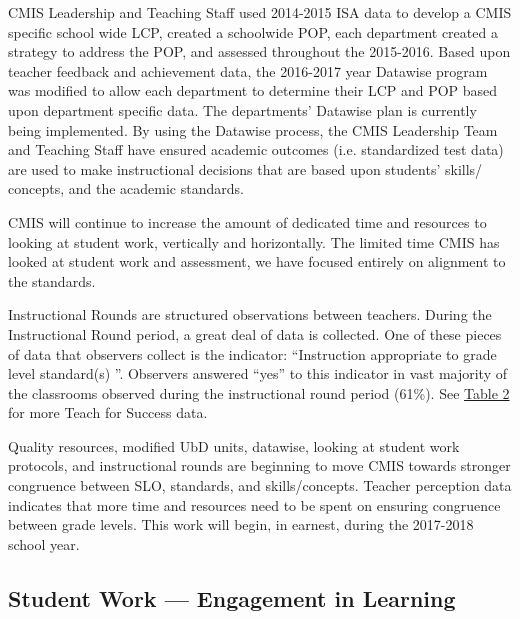 \documentclass{report}
\begin{document}
\begin{findings}
CMIS Leadership and Teaching Staff used 2014-2015 ISA data to develop a CMIS specific school wide LCP, created a schoolwide POP, each department created a strategy to address the POP, and assessed throughout the 2015-2016. Based upon teacher feedback and achievement data, the 2016-2017 year Datawise program was modified to allow each department to determine their LCP and POP based upon department specific data. The departments’ Datawise plan is currently being implemented. By using the Datawise process, the CMIS Leadership Team and Teaching Staff have ensured academic outcomes (i.e. standardized test data) are used to make instructional decisions that are based upon students’ skills/ concepts, and the academic standards. 


CMIS will continue to increase the amount of  dedicated time and resources to looking at student work, vertically and horizontally. The limited time CMIS has looked at student work and assessment, we have focused entirely on alignment to the standards. 


Instructional Rounds are structured observations between teachers. During the Instructional Round period, a great deal of data is collected. One of these pieces of data that observers collect is the indicator:  “Instruction appropriate to grade level standard(s) ”. Observers answered “yes” to this  indicator in vast majority of the classrooms observed during the instructional round period (61\%). See \href{https://docs.google.com/a/cmis.ac.th/document/d/1cRvL50iIDvo8s1Gnxoczm82LhSVmEOvCrFksxzHD7ko/edit?usp=sharing}{Table 2} for more Teach for Success data. 


Quality resources, modified UbD units, datawise, looking at student work protocols, and instructional rounds are beginning to move CMIS towards stronger congruence between SLO, standards, and skills/concepts. Teacher perception data indicates that more time and resources need to be spent on ensuring congruence between grade levels. This work will begin, in earnest, during the 2017-2018 school year. 
\end{findings}

\subsection{Student Work — Engagement in Learning}
\end{document}

